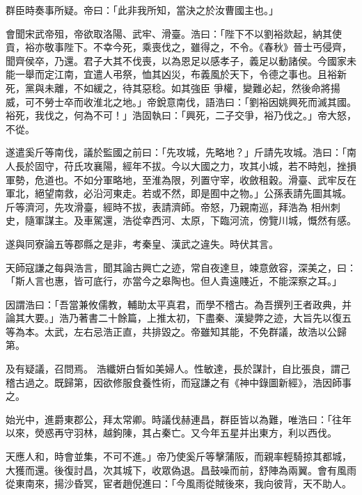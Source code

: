 \begin{pinyinscope}
 群臣時奏事所疑。帝曰：「此非我所知，當決之於汝曹國主也。」



 會聞宋武帝殂，帝欲取洛陽、武牢、滑臺。浩曰：「陛下不以劉裕欻起，納其使貢，裕亦敬事陛下。不幸今死，乘喪伐之，雖得之，不令。《春秋》晉士丐侵齊，聞齊侯卒，乃還。君子大其不伐喪，以為恩足以感孝子，義足以動諸侯。今國家未能一舉而定江南，宜遣人弔祭，恤其凶災，布義風於天下，令德之事也。且裕新死，黨與未離，不如緩之，待其惡稔。如其強臣
 爭權，變難必起，然後命將揚威，可不勞士卒而收淮北之地。」帝銳意南伐，語浩曰：「劉裕因姚興死而滅其國。裕死，我伐之，何為不可！」浩固執曰：「興死，二子交爭，裕乃伐之。」帝大怒，不從。



 遂遣奚斤等南伐，議於監國之前曰：「先攻城，先略地？」斤請先攻城。浩曰：「南人長於固守，苻氏攻襄陽，經年不拔。今以大國之力，攻其小城，若不時剋，挫損軍勢，危道也。不如分軍略地，至淮為限，列置守宰，收斂租穀。滑臺、武牢反在軍北，絕望南救，必沿河東走。若或不然，即是囿中之物。」公孫表請先圖其城。斤等濟河，先攻滑臺，經時不拔，表請濟師。帝怒，乃親南巡，拜浩為
 相州刺史，隨軍謀主。及車駕還，浩從幸西河、太原，下臨河流，傍覽川城，慨然有感。



 遂與同寮論五等郡縣之是非，考秦皇、漢武之違失。時伏其言。



 天師寇謙之每與浩言，聞其論古興亡之迹，常自夜達旦，竦意斂容，深美之，曰：「斯人言也惠，皆可底行，亦當今之皋陶也。但人貴遠賤近，不能深察之耳。」



 因謂浩曰：「吾當兼攸儒教，輔助太平真君，而學不稽古。為吾撰列王者政典，并論其大要。」浩乃著書二十餘篇，上推太初，下盡秦、漢變弊之迹，大旨先以復五等為本。太武，左右忌浩正直，共排毀之。帝雖知其能，不免群議，故浩以公歸第。



 及有疑議，召問焉。
 浩纖妍白皙如美婦人。性敏達，長於謀計，自比張良，謂己稽古過之。既歸第，因欲修服食養性術，而寇謙之有《神中錄圖新經》，浩因師事之。



 始光中，進爵東郡公，拜太常卿。時議伐赫連昌，群臣皆以為難，唯浩曰：「往年以來，熒惑再守羽林，越鉤陳，其占秦亡。又今年五星并出東方，利以西伐。



 天應人和，時會並集，不可不進。」帝乃使奚斤等擊蒲阪，而親率輕騎掠其都城，大獲而還。後復討昌，次其城下，收眾偽退。昌鼓噪而前，舒陣為兩翼。會有風雨從東南來，揚沙昏冥，宦者趙倪進曰：「今風雨從賊後來，我向彼背，天不助人。




\end{pinyinscope}
